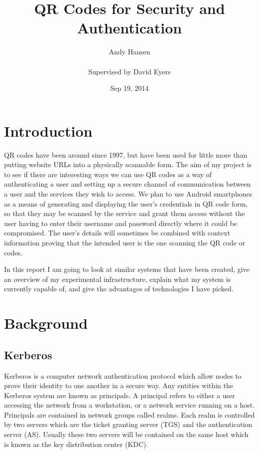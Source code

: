 \documentclass[]{report}   %
\begin{document}
\title{QR Codes for Security and Authentication}
\author{Andy Hansen\\\\
Supervised by David Eyers}
\date{Sep 19, 2014}
\maketitle
\tableofcontents

\section{Introduction}
QR codes have been around since 1997, but have been used for little more than putting website URLs into a physically scannable form. The aim of my project is to see if there are interesting ways we can use QR codes as a way of authenticating a user and setting up a secure channel of communication between a user and the services they wish to access. We plan to use Android smartphones as a means of generating and displaying the user's credentials in QR code form, so that they may be scanned by the service and grant them access without the user having to enter their username and password directly where it could be compromised. The user's details will sometimes be combined with context information proving that the intended user is the one scanning the QR code or codes.

In this report I am going to look at similar systems that have been created, give an overview of my experimental infrastructure, explain what my system is currently capable of, and give the advantages of technologies I have picked.

\section{Background}    
\subsection{Kerberos}
Kerberos \cite{Kerb} is a computer network authentication protocol which allow nodes to prove their identity to one another in a secure way. Any entities within the Kerberos system are known as principals. A principal refers to either a user accessing the network from a workstation, or a network service running on a host. Principals are contained in network groups called realms. Each realm is controlled by two servers which are the ticket granting server (TGS) and the authentication server (AS). Usually these two servers will be contained on the same host which is known as the key distribution center (KDC).
\end{document}
